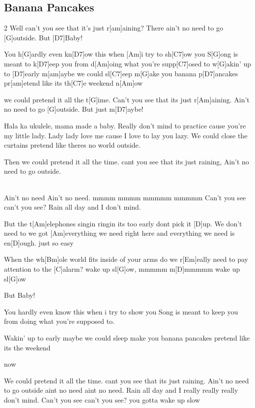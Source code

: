 \subsection*{Banana Pancakes   }
\begin{guitar}
  \begin{multicols}2{}
Well can't you see that it's just r[am]aining?
There ain't no need to go [G]outside.
But [D7]Baby!



You h[G]ardly even kn[D7]ow this
when [Am]i try to sh[C7]ow you
S[G]ong is meant to k[D7]eep you
from d[Am]oing what you're supp[C7]osed to
w[G]akin' up to [D7]early
m[am]aybe we could sl[C7]eep
m[G]ake you banana p[D7]ancakes
pr[am]etend like its th[C7]e weekend
n[Am]ow



we could pretend it all the t[G]ime.
Can't you see that its just r[Am]aining.
Ain't no need to go [G]outside.
But just m[D7]aybe!



Hala ka ukulele, 
mama made a baby.
Really don't mind to practice 
cause you're my little lady.
Lady lady love me 
cause I love to lay you lazy.
We could close the curtains 
pretend like theres no world
outside.



Then we could pretend it all the time.
cant you see that its just raining,
Ain't no need to go outside.



\\
Ain't no need Ain't no need.
mmmm  mmmm  mmmmm  mmmmm
Can't you see can't you see?
Rain all day and I don't mind.

\columnbreak


But the t[Am]elephones singin ringin 
its too early dont pick it [D]up.
We don't need to
we got [Am]everything we need right here 
and everything we need is en[D]ough.
just so easy


When the wh[Bm]ole world fits inside of your arms
do we r[Em]eally need to pay attention to the [C]alarm?
wake up sl[G]ow,  mmmmm m[D]mmmmm
wake up sl[G]ow



But Baby!

You hardly even know this
when i try to show you
Song is meant to keep you 
from doing what you're supposed to.


Wakin' up to early
maybe we could sleep
make you banana pancakes
pretend like its the weekend


now



We could pretend it all the time.
cant you see that its just raining.
Ain't no need to go outside
aint no need aint no need.
Rain all day and I really really really don't mind.
Can't you see can't you see?
you gotta wake up slow

\end{multicols}
\end{guitar}
